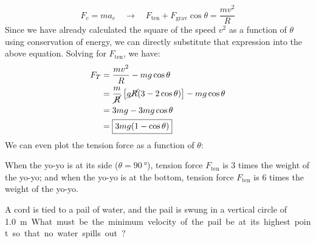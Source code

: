 \begin{example}[Yo-Yo]
%
  \begin{displaymath}
    F_c = ma_c\quad\rightarrow\quad
    F_\text{ten} + F_\text{grav}\cos\theta = \frac{mv^2}R
  \end{displaymath}
  Since we have already calculated the square of the speed $v^2$ as a function
  of $\theta$ using conservation of energy, we can directly substitute that
  expression into the above equation. Solving for $F_\text{ten}$, we have:
%
%      
%    
%      
%
  \begin{align*}
    F_T & = \frac{mv^2}R-mg\cos\theta\\
    &= \frac m{\cancel R}\left[g\cancel{R}(3-2\cos\theta)\right]-mg\cos\theta\\
    &= 3mg-3mg\cos\theta \\
    &=\boxed{3mg(1-\cos\theta)}
  \end{align*}
  We can even plot the tension force as a function of $\theta$:

  When the yo-yo is at its side ($\theta=\SI{90}{\degree}$), tension force
  $F_\text{ten}$ is 3 times the weight of the yo-yo; and when the yo-yo is at
  the bottom, tension force $F_\text{ten}$ is 6 times the weight of the yo-yo.
\end{example}



\begin{example}
  A cord is tied to a pail of water, and the pail is swung in a vertical circle
  of \SI{1.0}\metre. What must be the minimum velocity of the pail be at its
  highest point so that no water spills out?
\end{example}

